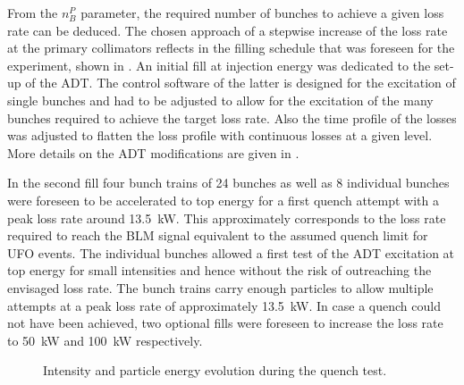 From the $n_B^P$ parameter, the required number of bunches to achieve a given loss rate can be deduced. The chosen approach of a stepwise increase of the loss rate at the primary collimators reflects in the filling schedule that was foreseen for the experiment, shown in . An initial fill at injection energy was dedicated to the set-up of the ADT. The control software of the latter is designed for the excitation of single bunches and had to be adjusted to allow for the excitation of the many bunches required to achieve the target loss rate. Also the time profile of the losses was adjusted to flatten the loss profile with continuous losses at a given level. More details on the ADT modifications are given in \cite{ACC-NOTE-16-0031}. 

In the second fill four bunch trains of 24 bunches as well as 8 individual bunches were foreseen to be accelerated to top energy for a first quench attempt with a peak loss rate around 13.5~kW. This approximately corresponds to the loss rate required to reach the BLM signal equivalent to the assumed quench limit for UFO events. The individual bunches allowed a first test of the ADT excitation at top energy  for small intensities and hence without the risk of outreaching the envisaged loss rate. The bunch trains carry enough particles to allow multiple attempts at a peak loss rate of approximately 13.5~kW. In case a quench could not have been achieved, two optional fills were foreseen to increase the loss rate to 50~kW and 100~kW respectively. 


\begin{figure}[htbp]
  \centering
  \caption{Intensity and particle energy evolution during the quench test.}  
  \label{pic:16071301}
  \end{figure}


